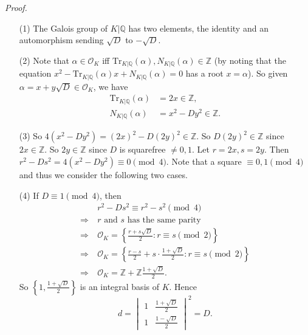 \documentclass{article}
\begin{document}
\emph{Proof.}
\begin{enumerate}
\item[(1)]
  The Galois group of $K|\mathbb{Q}$ has two elements, the identity
  and an automorphism sending $\sqrt{D}$ to $-\sqrt{D}$.

\item[(2)]
  Note that $\alpha \in \mathcal{O}_K$
  iff $\mathrm{Tr}_{K|\mathbb{Q}}(\alpha), N_{K|\mathbb{Q}}(\alpha) \in \mathbb{Z}$
  (by noting that the equation
  $x^2 - \mathrm{Tr}_{K|\mathbb{Q}}(\alpha) x + N_{K|\mathbb{Q}}(\alpha) = 0$ has
  a root $x = \alpha$).
  So given $\alpha = x + y \sqrt{D} \in \mathcal{O}_K$, we have
  \begin{align*}
    \mathrm{Tr}_{K|\mathbb{Q}}(\alpha) &= 2x \in \mathbb{Z}, \\
    N_{K|\mathbb{Q}}(\alpha) &= x^2 - D y^2 \in \mathbb{Z}.
  \end{align*}

\item[(3)]
  So $4(x^2 - D y^2) = (2x)^2 - D(2y)^2 \in \mathbb{Z}$.
  So $D(2y)^2 \in \mathbb{Z}$ since $2x \in \mathbb{Z}$.
  So $2y \in \mathbb{Z}$ since $D$ is squarefree $\neq 0, 1$.
  Let $r = 2x, s = 2y$.
  Then $r^2 - Ds^2 = 4(x^2 - D y^2) \equiv 0 \pmod 4$.
  Note that a square $\equiv 0, 1 \pmod 4$ and thus we consider the following two cases.

\item[(4)]
  If $D \equiv 1 \pmod 4$, then
  \begin{align*}
    &\:r^2 - Ds^2 \equiv r^2 - s^2 \pmod 4 \\
    \Longrightarrow &\:
    \text{$r$ and $s$ has the same parity} \\
    \Longrightarrow &\:
    \mathcal{O}_K = \left\{ \frac{r+s\sqrt{D}}{2} : r \equiv s \pmod 2 \right\} \\
    \Longrightarrow &\:
    \mathcal{O}_K = \left\{ \frac{r-s}{2} + s \cdot \frac{1+\sqrt{D}}{2}
      : r \equiv s \pmod 2 \right\} \\
    \Longrightarrow &\:
    \mathcal{O}_K = \mathbb{Z} + \mathbb{Z} \frac{1+\sqrt{D}}{2}.
  \end{align*}
  So $\left\{ 1, \frac{1+\sqrt{D}}{2} \right\}$ is an integral basis of $K$.
  Hence
  \[
    d
    =
    \begin{vmatrix}
      1 & \frac{1+\sqrt{D}}{2} \\
      1 & \frac{1-\sqrt{D}}{2}
    \end{vmatrix}^2
    = D.
  \]


\end{enumerate}
\end{document}
